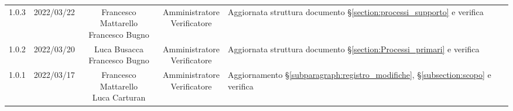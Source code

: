 \begin{center}
\begin{longtable}[c]{c | c | c | c | p{5cm}}
		1.0.3                                                      & 2022/03/22 & \Longunderstack{Francesco Mattarello                                                                                                                                                              \\Francesco Bugno} & \Longunderstack{Amministratore\\Verificatore} & Aggiornata struttura documento §\ref{section:processi_supporto} e verifica\\
		1.0.2                                                      & 2022/03/20 & \Longunderstack{Luca Busacca                                                                                                                                                                      \\Francesco Bugno} & \Longunderstack{Amministratore\\Verificatore} & Aggiornata struttura documento §\ref{section:Processi_primari} e verifica\\
		1.0.1                                                      & 2022/03/17 & \Longunderstack{Francesco Mattarello                                                                                                                                                              \\Luca Carturan} & \Longunderstack{Amministratore\\Verificatore} &  Aggiornamento §\ref{subparagraph:registro_modifiche}, §\ref{subsection:scopo} e verifica\\


\end{longtable}
\end{center}
